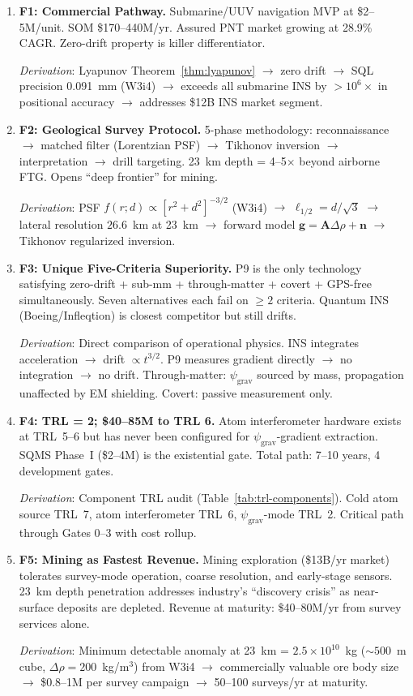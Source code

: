 \documentclass[11pt]{article}
\theoremstyle{definition}
\theoremstyle{remark}
\newcommand{\ee}[1]{\times10^{#1}}
\newcommand{\psigrav}{\psi_{\mathrm{grav}}}
\newcommand{\drho}{\Delta\rho}
\begin{document}
\begin{enumerate}
\item \textbf{F1: Commercial Pathway.}
  Submarine/UUV navigation MVP at \$2--5M/unit. SOM \$170--440M/yr. Assured PNT
  market growing at 28.9\% CAGR. Zero-drift property is killer differentiator.

  \textit{Derivation}: Lyapunov Theorem~\ref{thm:lyapunov} $\to$ zero drift $\to$
  SQL precision 0.091~mm (W3i4) $\to$ exceeds all submarine INS by $>10^6\times$
  in positional accuracy $\to$ addresses \$12B INS market segment.

\item \textbf{F2: Geological Survey Protocol.}
  5-phase methodology: reconnaissance $\to$ matched filter (Lorentzian PSF) $\to$
  Tikhonov inversion $\to$ interpretation $\to$ drill targeting. 23~km depth =
  4--5$\times$ beyond airborne FTG. Opens ``deep frontier'' for mining.

  \textit{Derivation}: PSF $f(r;d) \propto [r^2 + d^2]^{-3/2}$ (W3i4) $\to$
  $\ell_{1/2} = d/\sqrt{3}$ $\to$ lateral resolution $26.6$~km at 23~km $\to$
  forward model $\mathbf{g} = \mathbf{A}\drho + \mathbf{n}$ $\to$ Tikhonov
  regularized inversion.

\item \textbf{F3: Unique Five-Criteria Superiority.}
  P9 is the only technology satisfying zero-drift + sub-mm + through-matter +
  covert + GPS-free simultaneously. Seven alternatives each fail on $\geq 2$
  criteria. Quantum INS (Boeing/Infleqtion) is closest competitor but still drifts.

  \textit{Derivation}: Direct comparison of operational physics. INS integrates
  acceleration $\to$ drift $\propto t^{3/2}$. P9 measures gradient directly $\to$
  no integration $\to$ no drift. Through-matter: $\psigrav$ sourced by mass,
  propagation unaffected by EM shielding. Covert: passive measurement only.

\item \textbf{F4: TRL = 2; \$40--85M to TRL 6.}
  Atom interferometer hardware exists at TRL~5--6 but has never been configured
  for $\psigrav$-gradient extraction. SQMS Phase~I (\$2--4M) is the existential
  gate. Total path: 7--10 years, 4 development gates.

  \textit{Derivation}: Component TRL audit (Table~\ref{tab:trl-components}).
  Cold atom source TRL~7, atom interferometer TRL~6, $\psigrav$-mode TRL~2.
  Critical path through Gates 0--3 with cost rollup.

\item \textbf{F5: Mining as Fastest Revenue.}
  Mining exploration (\$13B/yr market) tolerates survey-mode operation, coarse
  resolution, and early-stage sensors. 23~km depth penetration addresses
  industry's ``discovery crisis'' as near-surface deposits are depleted.
  Revenue at maturity: \$40--80M/yr from survey services alone.

  \textit{Derivation}: Minimum detectable anomaly at 23~km = $2.5\ee{10}$~kg
  ($\sim 500$~m cube, $\drho = 200$~kg/m$^3$) from W3i4 $\to$ commercially
  valuable ore body size $\to$ \$0.8--1M per survey campaign $\to$ 50--100
  surveys/yr at maturity.
\end{enumerate}
\end{document}
